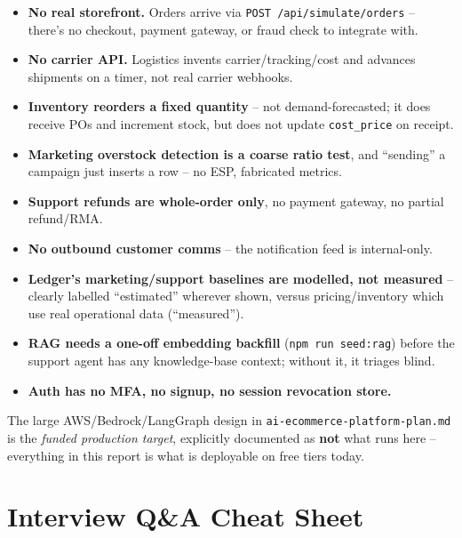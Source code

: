 \documentclass[11pt,a4paper]{article}
\begin{document}
\begin{keybox}
\begin{itemize}[itemsep=2pt]
\item \textbf{No real storefront.} Orders arrive via \texttt{POST /api/simulate/orders} --
there's no checkout, payment gateway, or fraud check to integrate with.
\item \textbf{No carrier API.} Logistics invents carrier/tracking/cost and advances shipments
on a timer, not real carrier webhooks.
\item \textbf{Inventory reorders a fixed quantity} -- not demand-forecasted; it does receive
POs and increment stock, but does not update \texttt{cost\_price} on receipt.
\item \textbf{Marketing overstock detection is a coarse ratio test}, and ``sending'' a campaign
just inserts a row -- no ESP, fabricated metrics.
\item \textbf{Support refunds are whole-order only}, no payment gateway, no partial refund/RMA.
\item \textbf{No outbound customer comms} -- the notification feed is internal-only.
\item \textbf{Ledger's marketing/support baselines are modelled, not measured} -- clearly
labelled ``estimated'' wherever shown, versus pricing/inventory which use real operational
data (``measured'').
\item \textbf{RAG needs a one-off embedding backfill} (\texttt{npm run seed:rag}) before the
support agent has any knowledge-base context; without it, it triages blind.
\item \textbf{Auth has no MFA, no signup, no session revocation store.}
\end{itemize}
\end{keybox}

The large AWS/Bedrock/LangGraph design in \texttt{ai-ecommerce-platform-plan.md} is the
\emph{funded production target}, explicitly documented as \textbf{not} what runs here --
everything in this report is what is deployable on free tiers today.

\section{Interview Q\&A Cheat Sheet}
\end{document}
